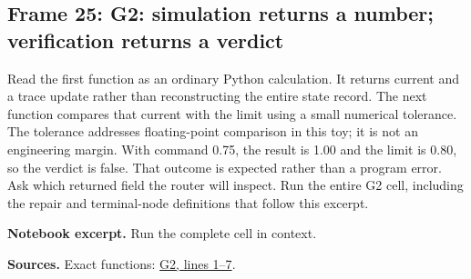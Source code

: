 \documentclass[11pt]{article}
\begin{document}
\subsection*{Frame 25: G2: simulation returns a number; verification returns a verdict}
Read the first function as an ordinary Python calculation. It returns current and a trace update rather than reconstructing the entire state record. The next function compares that current with the limit using a small numerical tolerance. The tolerance addresses floating-point comparison in this toy; it is not an engineering margin. With command 0.75, the result is 1.00 and the limit is 0.80, so the verdict is false. That outcome is expected rather than a program error. Ask which returned field the router will inspect. Run the entire G2 cell, including the repair and terminal-node definitions that follow this excerpt.\par
\par\noindent\begin{minipage}{\linewidth}\textbf{Notebook excerpt.} Run the complete cell in context.\par \end{minipage}\par
\par\nopagebreak\begin{minipage}{\linewidth}{\footnotesize\color{slate}\textbf{Sources.} Exact functions: \href{../Graph_Workflow_Lab.ipynb}{G2, lines 1--7}.\par}\end{minipage}\par\medskip
\end{document}
